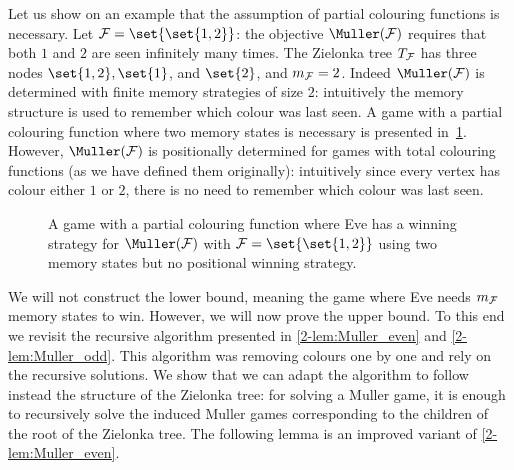Let us show on an example that the assumption of partial colouring functions is necessary.
Let $\F = \set{ \set{1,2} }$: the objective $\Muller(\F)$ requires that both $1$ and $2$ are seen infinitely many times.
The Zielonka tree $T_{\mathcal{F}}$ has three nodes $\set{1,2}, \set{1}$, and $\set{2}$, and $m_{\mathcal{F}} = 2$.
Indeed $\Muller(\F)$ is determined with finite memory strategies of size $2$:
intuitively the memory structure is used to remember which colour was last seen.
A game with a partial colouring function where two memory states is necessary is presented in~\cref{2-fig:lower_bound_zielonka}.
However, $\Muller(\F)$ is positionally determined for games with total colouring functions (as we have defined them originally):
intuitively since every vertex has colour either $1$ or $2$, there is no need to remember which colour was last seen.

\begin{figure}
\centering
\caption{A game with a partial colouring function 
where Eve has a winning strategy for $\Muller(\F)$ with $\F = \set{ \set{1,2} }$ using two memory states
but no positional winning strategy.}
\label{2-fig:lower_bound_zielonka}
\end{figure}

We will not construct the lower bound, meaning the game where Eve needs $m_{\mathcal{F}}$ memory states to win.
However, we will now prove the upper bound.
To this end we revisit the recursive algorithm presented in \cref{2-lem:Muller_even} and \cref{2-lem:Muller_odd}.
This algorithm was removing colours one by one and rely on the recursive solutions.
We show that we can adapt the algorithm to follow instead the structure of the Zielonka tree: 
for solving a Muller game, it is enough to recursively solve the induced Muller games
corresponding to the children of the root of the Zielonka tree.
The following lemma is an improved variant of \cref{2-lem:Muller_even}.

